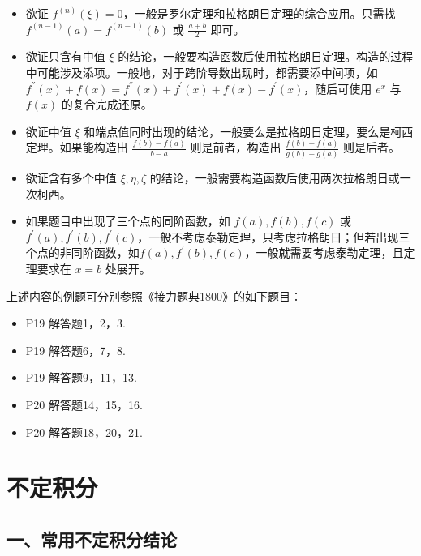 \documentclass[a5paper]{ctexart}
\begin{document}
	\begin{itemize}
		\item 欲证 $f^{(n)}(\xi) = 0$，一般是罗尔定理和拉格朗日定理的综合应用。只需找 $f^{(n - 1)}(a) = f^{(n - 1)}(b)$ 或 $\frac{a + b}{2}$ 即可。
		
		\item 欲证只含有中值 $\xi$ 的结论，一般要构造函数后使用拉格朗日定理。构造的过程中可能涉及添项。一般地，对于跨阶导数出现时，都需要添中间项，如 $f^{''}(x) +f(x) = f^{''}(x) +f^{'}(x) + f(x) - f^{'}(x) $，随后可使用 $e^x$ 与 $f(x)$ 的复合完成还原。
		
		\item 欲证中值 $\xi$ 和端点值同时出现的结论，一般要么是拉格朗日定理，要么是柯西定理。如果能构造出 $\frac{f(b) - f(a)}{b - a}$ 则是前者，构造出 $\frac{f(b) - f(a)}{g(b) - g(a)}$ 则是后者。
		
		\item 欲证含有多个中值 $\xi, \eta, \zeta$ 的结论，一般需要构造函数后使用两次拉格朗日或一次柯西。
		
		\item 如果题目中出现了三个点的同阶函数，如 $f(a), f(b), f(c)$ 或 $f^{'}(a), f^{'}(b), f^{'}(c)$，一般不考虑泰勒定理，只考虑拉格朗日；但若出现三个点的非同阶函数，如$f(a), f^{'}(b), f(c)$，一般就需要考虑泰勒定理，且定理要求在 $x = b$ 处展开。
	\end{itemize}
	
	上述内容的例题可分别参照《接力题典1800》的如下题目：
	\begin{itemize}
		\item P19 解答题1，2，3.
		
		\item P19 解答题6，7，8.
		
		\item P19 解答题9，11，13.
		
		\item P20 解答题14，15，16.
		
		\item P20 解答题18，20，21.
	\end{itemize}
	
	\section{不定积分}
	
	\subsection*{一、常用不定积分结论}
	
\end{document}
